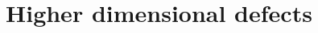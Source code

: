 \documentclass[11pt]{amsart}
\def\brian#1{{\textcolor{blue!65!red}{BRW: {#1}}}}
\begin{document}
\section{Higher dimensional defects} 


\printbibliography
\end{document}
